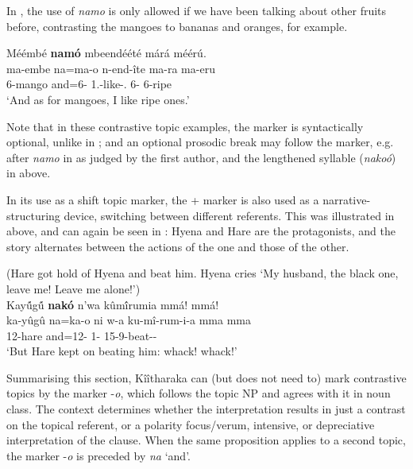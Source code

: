 \documentclass[output=paper]{langscibook}
\begin{document}
\z


In , the use of \textit{namo} is only allowed if we have been talking about other fruits before, contrasting the mangoes to bananas and oranges, for example.

\ea
\label{bkm:Ref94510498}
Méémbé \textbf{namó} mbeendéété márá méérú.\\
\gll
ma-embe  na=ma-o  n-end-îte  ma-ra  ma-eru\\
6-mango  and=6-\PRO{} 1\SG.\SM{}-like-\STAT.\PFV{} 6-\RM{} 6-ripe\\
\glt
‘And as for mangoes, I like ripe ones.’

\z


Note that in these contrastive topic examples, the marker is syntactically optional, unlike in ; and an optional prosodic break may follow the marker, e.g. after \textit{namo} in   as judged by the first author, and the lengthened syllable (\textit{nakoó}) in  above.

In its use as a shift topic marker, the \NA+{} \PRO{} marker is also used as a narrative-structuring device, switching between different referents. This was illustrated in  above, and can again be seen in : Hyena and Hare are the protagonists, and the story alternates between the actions of the one and those of the other.

\ea
\label{bkm:Ref94511291}
(Hare got hold of Hyena and beat him. Hyena cries ‘My husband, the black one, leave me! Leave me alone!’)\\
Kay\'{û}g\'{û} \textbf{nakó} n’wa kûm\'{î}rumia mmá! mmá!\\
\gll
ka-yûgû  na=ka-o  ni w-a  ku-mî-rum-i-a  mma    mma\\
12-hare  and=12-\PRO{}  \COP{} 1-\CONN{}  15-9\OM{}-beat-\SC-\FV{} \IDEO{}    \IDEO{}\\
\glt
‘But Hare kept on beating him: whack! whack!’

\z


Summarising this section, Kîîtharaka can (but does not need to) mark contrastive topics by the marker -\textit{o}, which follows the topic NP and agrees with it in noun class. The context determines whether the interpretation results in just a contrast on the topical referent, or a polarity focus/verum, intensive, or depreciative interpretation of the clause. When the same proposition applies to a second topic, the marker -\textit{o} is preceded by \textit{na} ‘and’.
\end{document}
